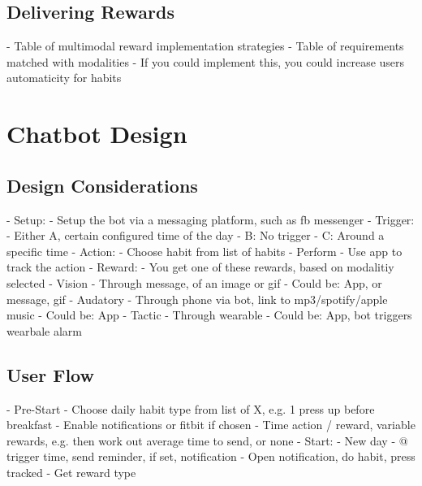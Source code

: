   \subsection{Delivering Rewards}
    - Table of multimodal reward implementation strategies
    - Table of requirements matched with modalities
    - If you could implement this, you could increase users automaticity for habits

\newpage
\section{Chatbot Design}
  \subsection{Design Considerations}
    - Setup:
      - Setup the bot via a messaging platform, such as fb messenger
    - Trigger:
        - Either A, certain configured time of the day
        -        B: No trigger
        -        C: Around a specific time
    - Action:
      - Choose habit from list of habits
      - Perform
      - Use app to track the action
    - Reward:
      - You get one of these rewards, based on modalitiy selected
      - Vision
        - Through message, of an image or gif
        - Could be: App, or message, gif
      - Audatory
        - Through phone via bot, link to mp3/spotify/apple music
        - Could be: App
      - Tactic
        - Through wearable
        - Could be: App, bot triggers wearbale alarm



  \subsection{User Flow}
      - Pre-Start
        - Choose daily habit type from list of X, e.g. 1 press up before breakfast
        - Enable notifications or fitbit if chosen
        - Time action / reward, variable rewards, e.g. then work out average time to send, or none
      - Start:
        - New day
        - @ trigger time, send reminder, if set, notification
        - Open notification, do habit, press tracked
        - Get reward type

